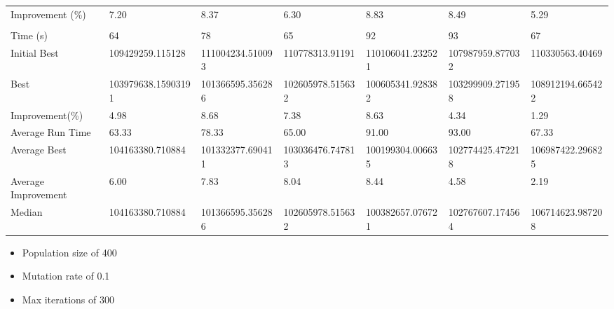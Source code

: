 \begin{table}[H]
{\begin{tabular}{lllllll}
\cellcolor[HTML]{ECF4FF}Improvement (\%)    & 7.20               & 8.37             & 6.30             & 8.83             & 8.49             & 5.29             \\
\cellcolor[HTML]{ECF4FF}                    &                    &                  &                  &                  &                  &                  \\
\cellcolor[HTML]{ECF4FF}Time (s)            & 64                 & 78               & 65               & 92               & 93               & 67               \\
\cellcolor[HTML]{ECF4FF}Initial Best        & 109429259.115128   & 111004234.510093 & 110778313.91191  & 110106041.232521 & 107987959.877032 & 110330563.40469  \\
\cellcolor[HTML]{ECF4FF}Best                & 103979638.15903191 & 101366595.356286 & 102605978.515632 & 100605341.928382 & 103299909.271958 & 108912194.665422 \\
\cellcolor[HTML]{ECF4FF}Improvement(\%)     & 4.98               & 8.68             & 7.38             & 8.63             & 4.34             & 1.29             \\
\rowcolor[HTML]{CBCEFB} 
\cellcolor[HTML]{DAE8FC}Average Run Time    & 63.33              & 78.33            & 65.00            & 91.00            & 93.00            & 67.33            \\
\rowcolor[HTML]{CBCEFB} 
\cellcolor[HTML]{DAE8FC}Average Best        & 104163380.710884   & 101332377.690411 & 103036476.747813 & 100199304.006635 & 102774425.472218 & 106987422.296825 \\
\rowcolor[HTML]{CBCEFB} 
\cellcolor[HTML]{DAE8FC}Average Improvement & 6.00               & 7.83             & 8.04             & 8.44             & 4.58             & 2.19             \\
\rowcolor[HTML]{CBCEFB} 
\cellcolor[HTML]{DAE8FC}Median              & 104163380.710884   & 101366595.356286 & 102605978.515632 & 100382657.076721 & 102767607.174564 & 106714623.987208
\end{tabular}%
}
\end{table}

\begin{itemize}
  \item Population size of 400
  \item Mutation rate of 0.1
  \item Max iterations of 300
\end{itemize}

